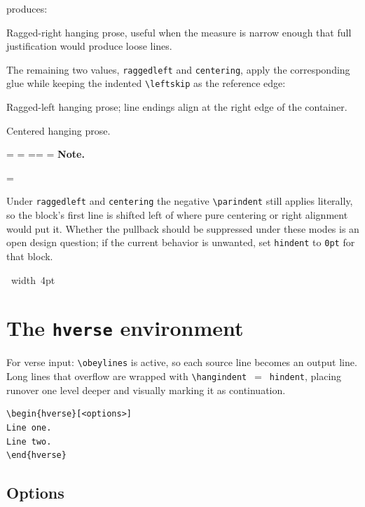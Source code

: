 \documentclass[11pt, twoside, openany]{article}
\makeatletter
\newcommand{\opt}[1]{\texttt{#1}}
\newcommand{\env}[1]{\texttt{#1}}
\newcommand{\cs}[1]{\texttt{\textbackslash #1}}
\newcommand*{\cns@tag@artifact@begin}{}
\newcommand*{\cns@tag@artifact@end}{}
\newenvironment{TodoNote}[1][]{%
  \par\addvspace{0.5\baselineskip plus 2pt}%
  \setbox\cns@box=\vbox\bgroup
    \hsize=\linewidth
    \advance\hsize -10pt
    \linewidth=\hsize \columnwidth=\hsize
    \parindent=\z@
    \noindent\textbf{\sffamily Note\cns@ifnotempty{#1}{ \textmd{(#1)}}.}%
    \par\nobreak
    \@afterindentfalse\@afterheading
    \leftskip=\cns@indent\relax
    \ignorespaces
}{%
  \par
  \egroup
  \vbox{\hbox{%
    \cns@tag@artifact@begin\vrule width 4pt\cns@tag@artifact@end
    \hskip 6pt\relax
    \box\cns@box
  }}%
  \par\addvspace{0.5\baselineskip plus 2pt}%
}
\makeatother
\begin{document}
\noindent produces:

\begin{hprose}[justification=raggedright]
Ragged-right hanging prose, useful when the measure is narrow
enough that full justification would produce loose lines.
\lipsum[12][1-2]
\end{hprose}

\noindent The remaining two values, \opt{raggedleft} and \opt{centering}, apply the corresponding glue while keeping the indented \cs{leftskip} as the reference edge:

\begin{hprose}[justification=raggedleft]
Ragged-left hanging prose; line endings align at the right edge
of the container. \lipsum[13][1-2]
\end{hprose}

\begin{hprose}[justification=centering]
Centered hanging prose. \lipsum[14][1-2]
\end{hprose}

\begin{TodoNote}
    Under \opt{raggedleft} and \opt{centering} the negative \cs{parindent} still applies literally, so the block's first line is shifted left of where pure centering or right alignment would put it. Whether the pullback should be suppressed under these modes is an open design question; if the current behavior is unwanted, set \opt{hindent} to \texttt{0pt} for that block.
\end{TodoNote}

\section{The \env{hverse} environment}

For verse input: \cs{obeylines} is active, so each source line becomes an output line. Long lines that overflow are wrapped with \cs{hangindent}~$=$~\opt{hindent}, placing runover one level deeper and visually marking it as continuation.

\begin{verbatim}
\begin{hverse}[<options>]
Line one.
Line two.
\end{hverse}
\end{verbatim}

\subsection*{Options}
\end{document}

